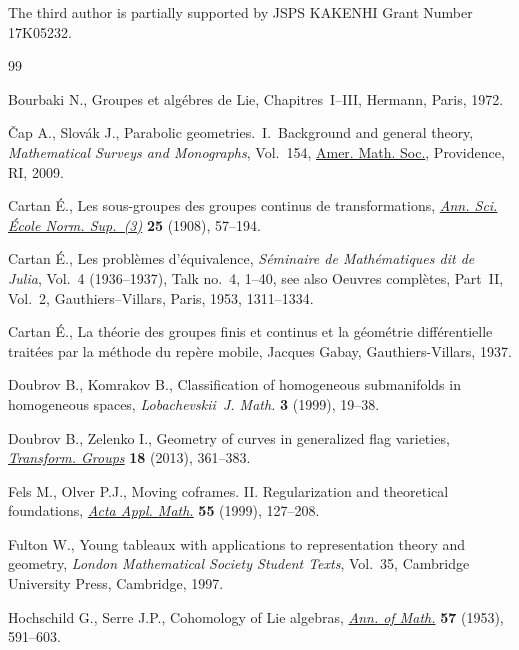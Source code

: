 \documentclass[pdftex]{sigma}%
\numberwithin{equation}{section}
\begin{document}
The third author is partially supported by JSPS KAKENHI Grant Number 17K05232.


\begin{thebibliography}{99}
\footnotesize\itemsep=0pt

Bourbaki N., Groupes et alg\'ebres de Lie, Chapitres~I--III, Hermann, Paris,
 1972.

\v{C}ap A., Slov\'ak J., Parabolic geometries.~{I}.~Background and general
 theory, \textit{Mathematical Surveys and Monographs}, Vol.~154, \href{https://doi.org/10.1090/surv/154}{Amer. Math.
 Soc.}, Providence, RI, 2009.

Cartan \'E., Les sous-groupes des groupes continus de transformations,
 \href{https://doi.org/10.24033/asens.588}{\textit{Ann. Sci. \'Ecole Norm. Sup.~(3)}} \textbf{25} (1908), 57--194.

Cartan \'E., Les probl\`emes d'\'equivalence, \textit{S\'eminaire de
 Math\'ematiques dit de Julia}, Vol.~4 (1936--1937), Talk no.~4, 1--40, see
 also Oeuvres compl\`etes, Part~II, Vol.~2, Gauthiers--Villars, Paris, 1953,
 1311--1334.

Cartan \'E., La th\'eorie des groupes finis et continus et la g\'eom\'etrie
 diff\'erentielle trait\'ees par la m\'ethode du rep\`ere mobile, {J}acques
 Gabay, Gauthiers-Villars, 1937.

Doubrov B., Komrakov B., Classification of homogeneous submanifolds in
 homogeneous spaces, \textit{Lobachevskii~J. Math.} \textbf{3} (1999), 19--38.

Doubrov B., Zelenko I., Geometry of curves in generalized flag varieties,
 \href{https://doi.org/10.1007/s00031-013-9217-x}{\textit{Transform. Groups}} \textbf{18} (2013), 361--383.

Fels M., Olver P.J., Moving coframes. {II}. {R}egularization and theoretical
 foundations, \href{https://doi.org/10.1023/A:1006195823000}{\textit{Acta Appl. Math.}} \textbf{55} (1999), 127--208.

Fulton W., Young tableaux with applications to representation theory and
 geometry, \textit{London Mathematical Society Student Texts}, Vol.~35,
 Cambridge University Press, Cambridge, 1997.

Hochschild G., Serre J.P., Cohomology of {L}ie algebras, \href{https://doi.org/10.2307/1969740}{\textit{Ann. of Math.}}
 \textbf{57} (1953), 591--603.


\end{thebibliography}
\end{document}
